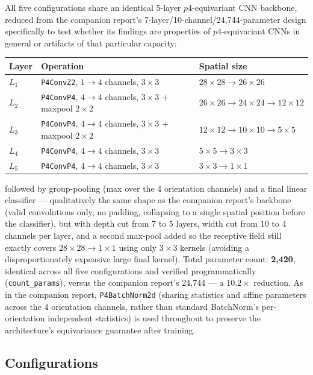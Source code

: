\documentclass[11pt]{article}
\begin{document}
All five configurations share an identical 5-layer $p4$-equivariant CNN backbone, reduced from the
companion report's 7-layer/10-channel/24{,}744-parameter design specifically to test whether its
findings are properties of $p4$-equivariant CNNs in general or artifacts of that particular capacity:

\begin{center}
\begin{tabular}{@{}lll@{}}
\toprule
Layer & Operation & Spatial size \\
\midrule
$L_1$ & \texttt{P4ConvZ2}, $1{\to}4$ channels, $3\times3$ & $28\times28 \to 26\times26$ \\
$L_2$ & \texttt{P4ConvP4}, $4{\to}4$ channels, $3\times3$ + maxpool $2\times2$ & $26\times26 \to 24\times24 \to 12\times12$ \\
$L_3$ & \texttt{P4ConvP4}, $4{\to}4$ channels, $3\times3$ + maxpool $2\times2$ & $12\times12 \to 10\times10 \to 5\times5$ \\
$L_4$ & \texttt{P4ConvP4}, $4{\to}4$ channels, $3\times3$ & $5\times5 \to 3\times3$ \\
$L_5$ & \texttt{P4ConvP4}, $4{\to}4$ channels, $3\times3$ & $3\times3 \to 1\times1$ \\
\bottomrule
\end{tabular}
\end{center}

followed by group-pooling (max over the 4 orientation channels) and a final linear classifier ---
qualitatively the same shape as the companion report's backbone (valid convolutions only, no padding,
collapsing to a single spatial position before the classifier), but with depth cut from 7 to 5 layers,
width cut from 10 to 4 channels per layer, and a second max-pool added so the receptive field still
exactly covers $28\times28 \to 1\times1$ using only $3\times3$ kernels (avoiding a disproportionately
expensive large final kernel). Total parameter count: \textbf{2{,}420}, identical across all five
configurations and verified programmatically (\texttt{count\_params}), versus the companion report's
24{,}744 --- a $10.2\times$ reduction. As in the companion report, \texttt{P4BatchNorm2d} (sharing
statistics and affine parameters across the 4 orientation channels, rather than standard BatchNorm's
per-orientation independent statistics) is used throughout to preserve the architecture's equivariance
guarantee after training.

\subsection{Configurations}
\end{document}
